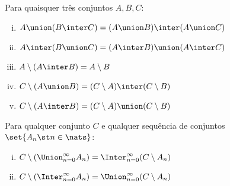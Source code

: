 \begin{exercise}
    Para quaisquer três conjuntos $A, B, C$:
    \begin{enumerate}[(i)]
        \item $A \union (B \inter C) = (A \union B) \inter (A \union C)$
        \item $A \inter (B \union C) = (A \inter B) \union (A \inter C)$
        \item $A \setminus (A \inter B) = A \setminus B$
        \item $C \setminus (A \union B) = (C \setminus A) \inter (C \setminus B)$
        \item $C \setminus (A \inter B) = (C \setminus A) \union (C \setminus B)$
    \end{enumerate}
\end{exercise}

\begin{exercise}
    Para qualquer conjunto $C$ e qualquer sequência de conjuntos $\set{A_n \st n \in \nats}$:
    \begin{enumerate}[(i)]
        \item $C \setminus (\Union_{n = 0}^{\infty} A_n) = \Inter_{n = 0}^{\infty} (C \setminus A_n)$
        \item $C \setminus (\Inter_{n = 0}^{\infty} A_n) = \Union_{n = 0}^{\infty} (C \setminus A_n)$
    \end{enumerate}
\end{exercise}
